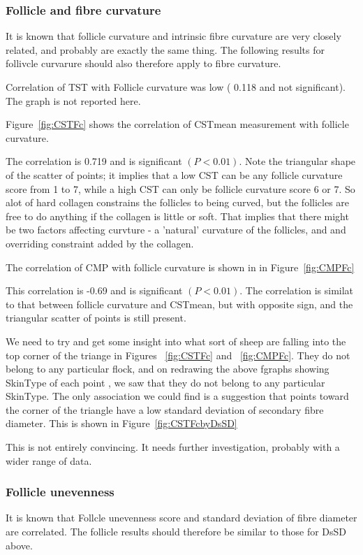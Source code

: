 \documentclass[titlepage]{article}  %
\begin{document}
\subsubsection{Follicle and fibre curvature}
It is known that follicle curvature and intrinsic fibre curvature are very closely related, and probably are exactly the same thing. The following results for follivcle curvarure should also therefore apply to fibre curvature.

Correlation of TST with Follicle curvature was low ( 0.118 and not significant). The graph is not reported here.

Figure~\ref{fig:CSTFc} shows the correlation of CSTmean measurement with follicle curvature. 

The correlation is  0.719 and is significant $(P<0.01)$. Note the triangular shape of the scatter of points; it implies that a low CST can be any follicle curvature score from 1 to 7, while a high CST can only be follicle curvature score 6 or 7. So alot of hard collagen constrains the follicles to being curved, but the follicles are free to do anything if the collagen is little or soft. That implies that there might be two factors affecting curvture - a 'natural' curvature of the follicles, and and overriding constraint added by the collagen. 

The correlation of CMP with follicle curvature is shown in in Figure~\ref{fig:CMPFc}

This correlation is -0.69 and is significant $(P<0.01)$. The correlation is similat to that between follicle curvature and CSTmean, but with opposite sign, and the triangular scatter of points is still present. 

We need to try and get some insight into what sort of sheep are falling into the top corner of the triange in Figures ~\ref{fig:CSTFc} and ~\ref{fig:CMPFc}. They do not belong to any particular flock, and on redrawing the above fgraphs showing SkinType of each point , we saw that they do not belong to any particular SkinType. The only association we could find is a suggestion that points toward the corner of the triangle have a low standard deviation of secondary fibre diameter. This is shown in Figure~\ref{fig:CSTFcbyDsSD}

This is not entirely convincing. It needs further investigation, probably with a wider range of data.

\subsubsection{Follicle unevenness}
It is known that Follcle unevenness score and standard deviation of fibre diameter are correlated. The follicle results should therefore be similar to those for DsSD above.
\end{document}

